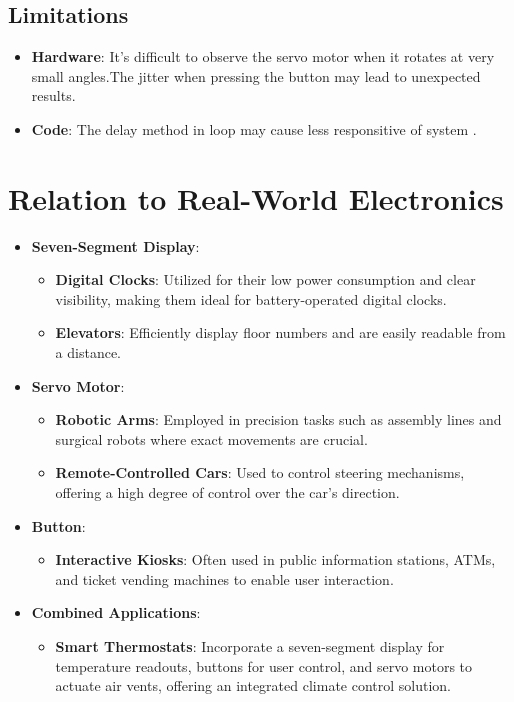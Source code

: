 \documentclass[journal]{IEEEtran}
\begin{document}
\subsection{Limitations}
\begin{itemize}
    \item \textbf{Hardware}: It's difficult to observe the servo motor when it rotates at very small angles.The jitter when pressing the button may lead to unexpected results.
    \item \textbf{Code}: The delay method in loop may cause less responsitive of system .
\end{itemize}


\section{Relation to Real-World Electronics}
\begin{itemize}
  \item \textbf{Seven-Segment Display}:
    \begin{itemize}
      \item \textbf{Digital Clocks}: Utilized for their low power consumption and clear visibility, making them ideal for battery-operated digital clocks\cite{elec1601_notes}.
      \item \textbf{Elevators}: Efficiently display floor numbers and are easily readable from a distance.
    \end{itemize}

  \item \textbf{Servo Motor}:
    \begin{itemize}
      \item \textbf{Robotic Arms}: Employed in precision tasks such as assembly lines and surgical robots where exact movements are crucial.
      \item \textbf{Remote-Controlled Cars}: Used to control steering mechanisms, offering a high degree of control over the car's direction.
    \end{itemize}
  
  \item \textbf{Button}:
    \begin{itemize}
      \item \textbf{Interactive Kiosks}: Often used in public information stations, ATMs, and ticket vending machines to enable user interaction\cite{AllAboutCircuits}.
    \end{itemize}

  \item \textbf{Combined Applications}:
    \begin{itemize}
      \item \textbf{Smart Thermostats}: Incorporate a seven-segment display for temperature readouts, buttons for user control, and servo motors to actuate air vents, offering an integrated climate control solution.
    \end{itemize}
\end{itemize}
\end{document}
